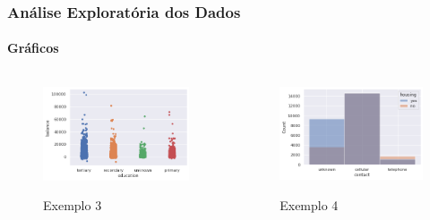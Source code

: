 \documentclass{beamer}
\begin{document}
\begin{frame}
\frametitle{Análise Exploratória dos Dados}
\framesubtitle{Gráficos}


\begin{columns}
    \begin{column}{0.5\textwidth}
        \begin{figure}[h]
            \caption{Exemplo 3}
            \centering %
            \includegraphics[width=1\textwidth]{IMGS/img3.png}
            \label{figura:distidade}
        \end{figure}
    \end{column}
    \begin{column}{0.5\textwidth}
        \begin{figure}[h]
            \caption{Exemplo 4}
            \centering %
            \includegraphics[width=1\textwidth]{IMGS/img4.png}
            \label{figura:fig4}
        \end{figure}
    \end{column}
    \end{columns} 
      
\end{frame}
\end{document}
